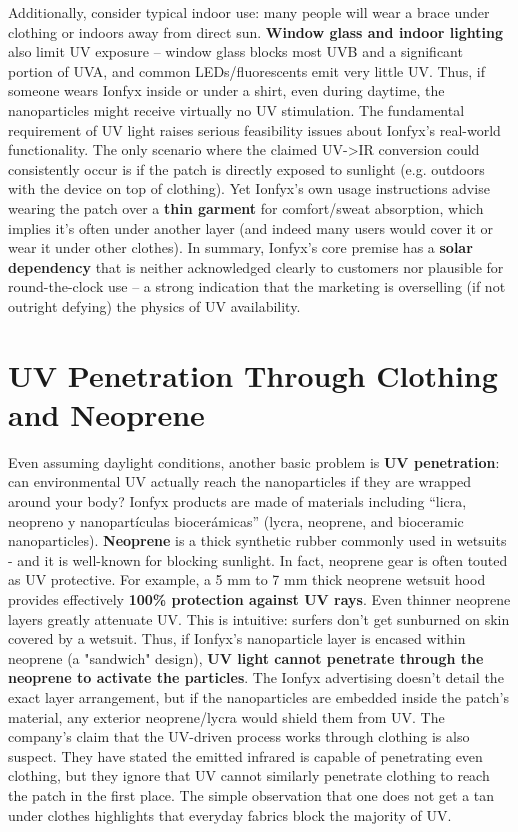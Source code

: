\documentclass{article}
\begin{document}
Additionally, consider typical indoor use: many people will wear a brace under clothing or indoors away from direct sun. \textbf{Window glass and indoor lighting} also limit UV exposure – window glass blocks most UVB and a significant portion of UVA, and common LEDs/fluorescents emit very little UV. Thus, if someone wears Ionfyx inside or under a shirt, even during daytime, the nanoparticles might receive virtually no UV stimulation. The fundamental requirement of UV light raises serious feasibility issues about Ionfyx's real-world functionality. The only scenario where the claimed UV->IR conversion could consistently occur is if the patch is directly exposed to sunlight (e.g. outdoors with the device on top of clothing). Yet Ionfyx's own usage instructions advise wearing the patch over a \textbf{thin garment} for comfort/sweat absorption, which implies it's often under another layer (and indeed many users would cover it or wear it under other clothes). In summary, Ionfyx's core premise has a \textbf{solar dependency} that is neither acknowledged clearly to customers nor plausible for round-the-clock use – a strong indication that the marketing is overselling (if not outright defying) the physics of UV availability.

\section{UV Penetration Through Clothing and Neoprene}

Even assuming daylight conditions, another basic problem is \textbf{UV penetration}: can environmental UV actually reach the nanoparticles if they are wrapped around your body? Ionfyx products are made of materials including “licra, neopreno y nanopartículas biocerámicas” (lycra, neoprene, and bioceramic nanoparticles). \textbf{Neoprene} is a thick synthetic rubber commonly used in wetsuits - and it is well-known for blocking sunlight. In fact, neoprene gear is often touted as UV protective. For example, a 5 mm to 7 mm thick neoprene wetsuit hood provides effectively \textbf{100\% protection against UV rays}. Even thinner neoprene layers greatly attenuate UV. This is intuitive: surfers don't get sunburned on skin covered by a wetsuit. Thus, if Ionfyx's nanoparticle layer is encased within neoprene (a "sandwich" design), \textbf{UV light cannot penetrate through the neoprene to activate the particles}. The Ionfyx advertising doesn't detail the exact layer arrangement, but if the nanoparticles are embedded inside the patch's material, any exterior neoprene/lycra would shield them from UV. The company's claim that the UV-driven process works through clothing is also suspect. They have stated the emitted infrared is capable of penetrating even clothing, but they ignore that UV cannot similarly penetrate clothing to reach the patch in the first place. The simple observation that one does not get a tan under clothes highlights that everyday fabrics block the majority of UV.
\end{document}
